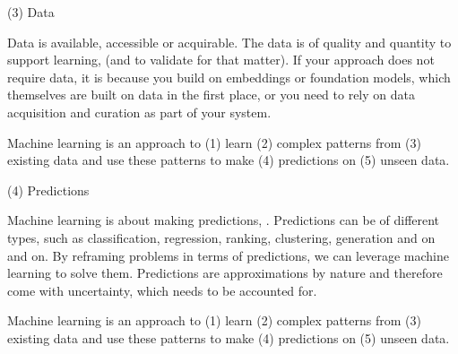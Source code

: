  \begin{frame}{(3) Data}
    \begin{withmargin}
      \begin{tdmain}
          Data is available, accessible or acquirable. 
          The data is of  quality and quantity to support learning, (and to validate for that matter).
          If your approach does not require data, it is because you build on embeddings or foundation models, 
          which themselves are built on data in the first place, or you need to rely on data acquisition and curation as part of your system.
      \end{tdmain}
      \begin{tdmargin}
          Machine learning is an approach to (1) learn (2) complex patterns
          from (3) existing data and use these patterns to make (4)
          predictions on (5) unseen data.
      \end{tdmargin}
    \end{withmargin}
  \end{frame}

  \begin{frame}{(4) Predictions}
    \begin{withmargin}
      \begin{tdmain}
          Machine learning is about making predictions, . Predictions can be of different types, such as 
          classification, regression, ranking, clustering, generation and on and on.
          By reframing problems in terms of predictions, we can leverage machine learning to solve them.
          Predictions are approximations by nature and therefore come with uncertainty, 
          which needs to be accounted for.

      \end{tdmain}
      \begin{tdmargin}
          Machine learning is an approach to (1) learn (2) complex patterns
          from (3) existing data and use these patterns to make (4)
          predictions on (5) unseen data.
      \end{tdmargin}
    \end{withmargin}
  \end{frame}

